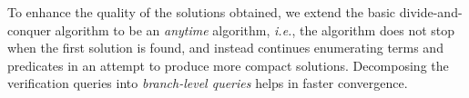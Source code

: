 \documentclass{llncs}
\newcommand{\ie}{\emph{i.e.}}
\newcommand\Expr{e}
\newcommand\Term{t}
\newcommand\SynthFun{f}
\newcommand\ITE[3]{\mathtt{if}~#1~\mathtt{then}~#2~\mathtt{else}~#3}
\renewcommand{\paragraph}[1]{\par\noindent\textbf{#1.}}
\begin{document}
To enhance the quality of the solutions obtained, we extend the basic
divide-and-conquer algorithm to be an \emph{anytime}
algorithm, \ie, the algorithm does not stop when the first
solution is found, and instead continues enumerating terms and
predicates in an attempt to produce more compact
solutions. Decomposing the verification queries into
\emph{branch-level queries} helps in faster convergence.




\end{document}

